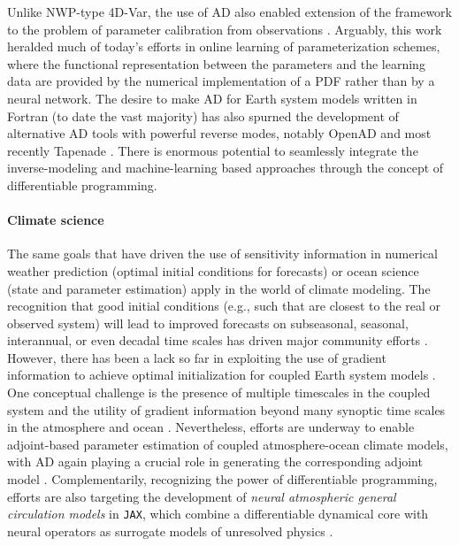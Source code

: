 Unlike NWP-type 4D-Var, the use of AD also enabled extension of the framework to the problem of parameter calibration from observations \cite{Ferreira.2005,Stammer:2005dw,Liu:2012jd}. 
Arguably, this work heralded much of today's efforts in online learning of parameterization schemes, where the functional representation between the parameters and the learning data are provided by the numerical implementation of a PDF rather than by a neural network.
The desire to make AD for Earth system models written in Fortran (to date the vast majority) has also spurned the development of alternative AD tools with powerful reverse modes, notably OpenAD \cite{Utke:2008ko} and most recently Tapenade \cite{Hascoet.2013,Gaikwad.2023,Gaikwad.2024}.
There is enormous potential to seamlessly integrate the inverse-modeling and machine-learning based approaches through the concept of differentiable programming.

\paragraph{Climate science}

The same goals that have driven the use of sensitivity information in numerical weather prediction (optimal initial conditions for forecasts) or ocean science (state and parameter estimation) apply in the world of climate modeling.
The recognition that good initial conditions (e.g., such that are closest to the real or observed system) will lead to improved forecasts on subseasonal, seasonal, interannual, or even decadal time scales has driven major community efforts \cite{Meehl.2021}. However, there has been a lack so far in exploiting the use of gradient information to achieve optimal initialization for coupled Earth system models \cite{Frolov.2023}. 
One conceptual challenge is the presence of multiple timescales in the coupled system and the utility of gradient information beyond many synoptic time scales in the atmosphere and ocean \cite{Lea:2000gv,Lea:2002cv}.
Nevertheless, efforts are underway to enable adjoint-based parameter estimation of coupled atmosphere-ocean climate models, with AD again playing a crucial role in generating the corresponding adjoint model
\cite{Blessing.2014,Lyu.2018,Stammer:2018de}.
Complementarily, recognizing the power of differentiable programming, efforts are also targeting the development of \textit{neural atmospheric general circulation models} in \texttt{JAX}, which combine a differentiable dynamical core with neural operators as surrogate models of unresolved physics
\cite{Kochkov.2023}.

